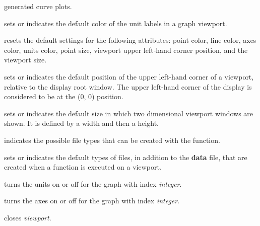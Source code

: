 \begin{description}
generated curve plots.
%
\item[\spadfun{unitsColorDefault}]
sets or indicates the default color of the
unit labels in a \twodim{} graph viewport.
%
\item[\spadfun{viewDefaults}]\funArgs{}
resets the default settings for the following
attributes:  point color, line color, axes color, units color, point size,
viewport upper left-hand corner position, and the viewport size.
%
\item[\spadfun{viewPosDefault}]
sets or indicates the default position of the
upper left-hand corner of a \twodim{} viewport, relative to the
display root window.
The upper left-hand corner of the display is considered to be at the
(0, 0) position.
%
\item[\spadfun{viewSizeDefault}]
sets or
indicates the default size in which two
dimensional viewport windows are shown.
It is defined by a width and then a height.
%
\item[\spadfun{viewWriteAvailable}]\funArgs{\optArg{list\argDef{["pixmap",
"bitmap", "postscript", \"image"}}}
indicates the possible file types
that can be created with the  function.
%
\item[\spadfun{viewWriteDefault}]
sets or indicates the default types of files, in
addition to the {\bf data} file, that are created when a
 function is executed on a viewport.
%
\item[\spadfun{units}]
turns the units on or off for the graph with index {\it integer}.
%
\item[\spadfun{axes}]
turns the axes on
or off for the graph with index {\it integer}.
%
\item[\spadfun{close}]
closes {\it viewport}.
%
\item[\spadfun{connect}]

\end{description}
